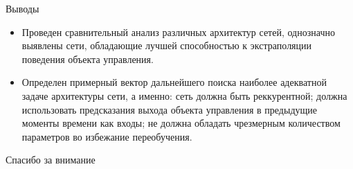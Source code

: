 \documentclass{beamer}
\begin{document}
\begin{frame}{Выводы}
\begin{itemize}
\item Проведен сравнительный анализ различных архитектур сетей, однозначно выявлены сети, обладающие лучшей способностью к экстраполяции поведения объекта управления.
\item Определен примерный вектор дальнейшего поиска наиболее адекватной задаче архитектуры сети, а именно: сеть должна быть реккурентной; должна использовать предсказания выхода  объекта управления в предыдущие моменты времени как входы; не должна обладать чрезмерным количеством параметров во избежание переобучения.
\end{itemize}
\end{frame}

\begin{frame}
\centering
Спасибо за внимание
\end{frame}
\end{document}
